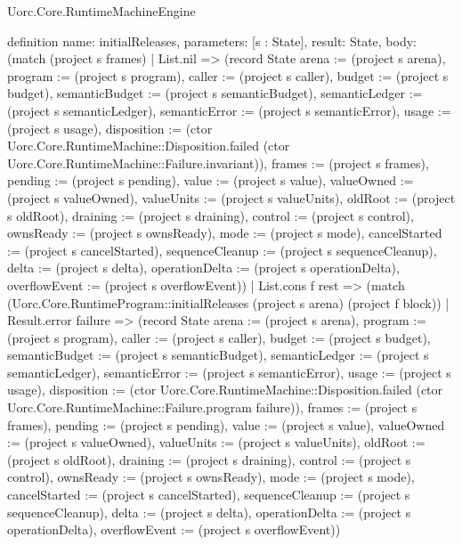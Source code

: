 \begin{lexlean}{Uorc.Core.RuntimeMachineEngine}
\begin{semanticmodule}
definition{
  name: initialReleases,
  parameters: [s : State],
  result: State,
  body: (match (project s frames)
    | List.nil => (record State {arena := (project s arena), program := (project s program), caller := (project s caller), budget := (project s budget), semanticBudget := (project s semanticBudget), semanticLedger := (project s semanticLedger), semanticError := (project s semanticError), usage := (project s usage), disposition := (ctor Uorc.Core.RuntimeMachine::Disposition.failed (ctor Uorc.Core.RuntimeMachine::Failure.invariant)), frames := (project s frames), pending := (project s pending), value := (project s value), valueOwned := (project s valueOwned), valueUnits := (project s valueUnits), oldRoot := (project s oldRoot), draining := (project s draining), control := (project s control), ownsReady := (project s ownsReady), mode := (project s mode), cancelStarted := (project s cancelStarted), sequenceCleanup := (project s sequenceCleanup), delta := (project s delta), operationDelta := (project s operationDelta), overflowEvent := (project s overflowEvent)})
    | List.cons f rest => (match (Uorc.Core.RuntimeProgram::initialReleases (project s arena) (project f block))
      | Result.error failure => (record State {arena := (project s arena), program := (project s program), caller := (project s caller), budget := (project s budget), semanticBudget := (project s semanticBudget), semanticLedger := (project s semanticLedger), semanticError := (project s semanticError), usage := (project s usage), disposition := (ctor Uorc.Core.RuntimeMachine::Disposition.failed (ctor Uorc.Core.RuntimeMachine::Failure.program failure)), frames := (project s frames), pending := (project s pending), value := (project s value), valueOwned := (project s valueOwned), valueUnits := (project s valueUnits), oldRoot := (project s oldRoot), draining := (project s draining), control := (project s control), ownsReady := (project s ownsReady), mode := (project s mode), cancelStarted := (project s cancelStarted), sequenceCleanup := (project s sequenceCleanup), delta := (project s delta), operationDelta := (project s operationDelta), overflowEvent := (project s overflowEvent)})
}
\end{semanticmodule}
\end{lexlean}
